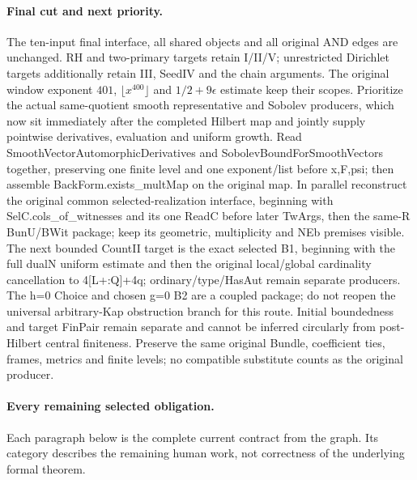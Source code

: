 \paragraph{Final cut and next priority.}
The ten-input final interface, all shared objects and all original
AND edges are unchanged. RH and two-primary targets retain I/II/V;
unrestricted Dirichlet targets additionally retain III, SeedIV and
the chain arguments. The original window exponent $401$,
$\lfloor x^{400}\rfloor$ and $1/2+9\epsilon$ estimate keep their scopes.
Prioritize the actual same-quotient smooth representative and Sobolev producers, which now sit immediately after the completed Hilbert map and jointly supply pointwise derivatives, evaluation and uniform growth. Read SmoothVectorAutomorphicDerivatives and SobolevBoundForSmoothVectors together, preserving one finite level and one exponent/list before x,F,psi; then assemble BackForm.exists\_multMap on the original map. In parallel reconstruct the original common selected-realization interface, beginning with SelC.cols\_of\_witnesses and its one ReadC before later TwArgs, then the same-R BunU/BWit package; keep its geometric, multiplicity and NEb premises visible. The next bounded CountII target is the exact selected B1, beginning with the full dualN uniform estimate and then the original local/global cardinality cancellation to 4[L+:Q]+4q; ordinary/type/HasAut remain separate producers. The h=0 Choice and chosen g=0 B2 are a coupled package; do not reopen the universal arbitrary-Kap obstruction branch for this route. Initial boundedness and target FinPair remain separate and cannot be inferred circularly from post-Hilbert central finiteness. Preserve the same original Bundle, coefficient ties, frames, metrics and finite levels; no compatible substitute counts as the original producer.

\paragraph{Every remaining selected obligation.}
Each paragraph below is the complete current contract from the graph.
Its category describes the remaining human work, not correctness of
the underlying formal theorem.
